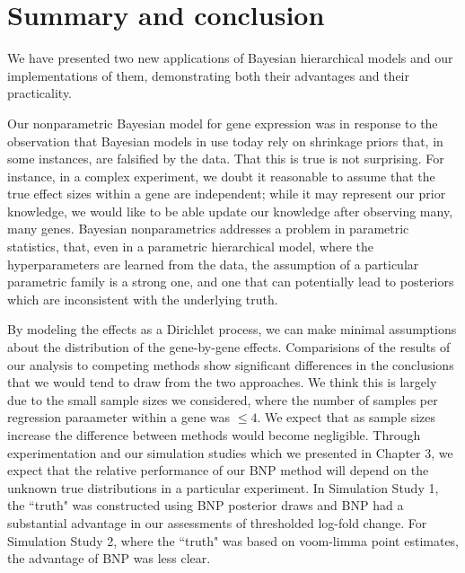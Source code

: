 \chapter{Summary and conclusion}

We have presented two new applications of Bayesian hierarchical models and our implementations of them, demonstrating both their advantages and their practicality.

Our nonparametric Bayesian model for gene expression was in response to the observation that Bayesian models in use today rely on shrinkage priors that, in some instances, are falsified by the data. That this is true is not surprising. For instance, in a complex experiment, we doubt it reasonable to assume that the true effect sizes within a gene are independent; while it may represent our prior knowledge, we would like to be able update our knowledge after observing many, many genes. Bayesian nonparametrics addresses a problem in parametric statistics, that, even in a parametric hierarchical model, where the hyperparameters are learned from the data, the assumption of a particular parametric family is a strong one, and one that can potentially lead to posteriors which are inconsistent with the underlying truth.

By modeling the effects as a Dirichlet process, we can make minimal assumptions about the distribution of the gene-by-gene effects. Comparisions of the results of our analysis to competing methods show significant differences in the conclusions that we would tend to draw from the two approaches. We think this is largely due to the small sample sizes we considered, where the number of samples per regression paraameter within a gene was $\le 4$. We expect that as sample sizes increase the difference between methods would become negligible. Through experimentation and our simulation studies which we presented in Chapter 3, we expect that the relative performance of our BNP method will depend on the unknown true distributions in a particular experiment. In Simulation Study 1, the ``truth" was constructed using BNP posterior draws and BNP had a substantial advantage in our assessments of thresholded log-fold change. For Simulation Study 2, where the ``truth" was based on voom-limma point estimates, the advantage of BNP was less clear.

